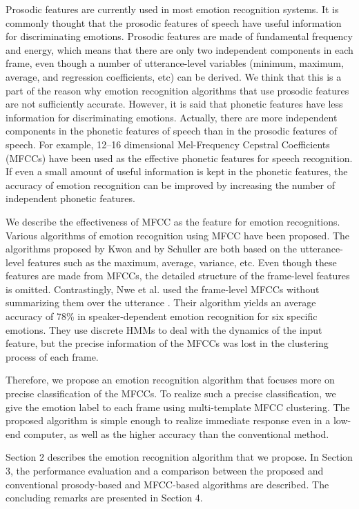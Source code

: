 \documentclass[english]{jnlp_1.3e}
\begin{document}
Prosodic features are currently used in most emotion recognition systems. It is commonly thought that the prosodic features of speech have useful information for discriminating emotions. Prosodic features are made of fundamental frequency and energy, which means that there are only two independent components in each frame, even though a number of utterance-level variables (minimum, maximum, average, and regression coefficients, etc) can be derived. We think that this is a part of the reason why emotion recognition algorithms that use prosodic features are not sufficiently accurate. However, it is said that phonetic features have less information for discriminating emotions. Actually, there are more independent components in the phonetic features of speech than in the prosodic features of speech. For example, 12--16 dimensional Mel-Frequency Cepstral Coefficients (MFCCs) have been used as the effective phonetic features for speech recognition. If even a small amount of useful information is kept in the phonetic features, the accuracy of emotion recognition can be improved by increasing the number of independent phonetic features.

We describe the effectiveness of MFCC as the feature for emotion recognitions. Various algorithms of emotion recognition using MFCC have been proposed. The algorithms proposed by Kwon \cite{Kwon2003} and by Schuller \cite{Schuller2005} are both based on the utterance-level features such as the maximum, average, variance, etc. Even though these features are made from MFCCs, the detailed structure of the frame-level features is omitted. Contrastingly, Nwe et al. used the frame-level MFCCs without summarizing them over the utterance \cite{Nwe2003}. Their algorithm yields an average accuracy of 78\% in speaker-dependent emotion recognition for six specific emotions. They use discrete HMMs to deal with the dynamics of the input feature, but the precise information of the MFCCs was lost in the clustering process of each frame.

Therefore, we propose an emotion recognition algorithm that focuses more on precise classification of the MFCCs. To realize such a precise classification, we give the emotion label to each frame using multi-template MFCC clustering. The proposed algorithm is simple enough to realize immediate response even in a low-end computer, as well as the higher accuracy than the conventional method.

Section 2 describes the emotion recognition algorithm that we propose. In Section 3, the performance evaluation and a comparison between the proposed and conventional prosody-based and MFCC-based algorithms are described. The concluding remarks are presented in Section 4.
\end{document}
